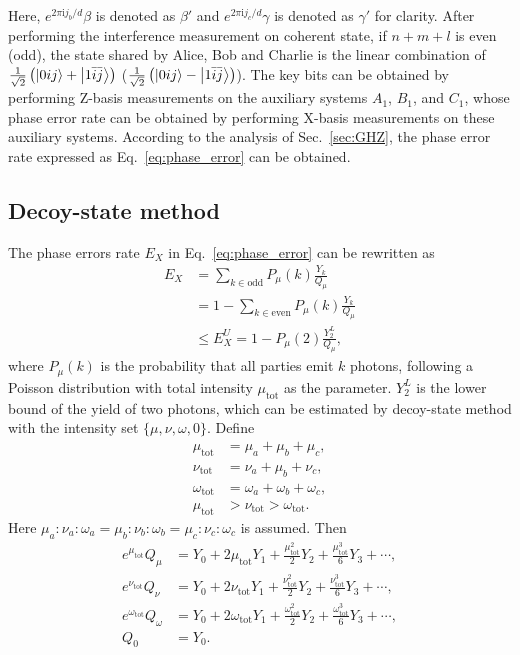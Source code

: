 \documentclass[aps,twocolumn,superscriptaddress,showpacs,nofootinbib]{revtex4-2}
\renewcommand{\i}{\mathrm{i}}
\begin{document}
Here, $e^{2\pi\i j_b/d}\beta$ is denoted as $\beta'$ and $e^{2\pi\i j_c/d}\gamma$ is denoted as $\gamma'$ for clarity. After performing the interference measurement on coherent state, if $n+m+l$ is even (odd), the state shared by Alice, Bob and Charlie is the linear combination of $\frac{1}{\sqrt{2}}\left(\ket{0 i j} + \ket{1 \bar{i} \bar{j}}\right)$ ($\frac{1}{\sqrt{2}}\left(\ket{0 i j} - \ket{1 \bar{i} \bar{j}}\right)$). The key bits can be obtained by performing Z-basis measurements on the auxiliary systems $A_1$, $B_1$, and $C_1$, whose phase error rate can be obtained by performing X-basis measurements on these auxiliary systems. According to the analysis of Sec.~\ref{sec:GHZ}, the phase error rate expressed as Eq.~\eqref{eq:phase_error} can be obtained.


\subsection{Decoy-state method}\label{sec:dsm}
The phase errors rate $E_X$ in Eq.~\eqref{eq:phase_error} can be rewritten as
\begin{equation}
\begin{split}
E_X & = \sum_{k \in \text{odd}} P_\mu(k) \frac{Y_k}{Q_\mu} \\
& = 1- \sum_{k \in \text{even}} P_\mu(k) \frac{Y_k}{Q_\mu} \\
& \leq E_X^U = 1 - P_\mu(2) \frac{Y_2^L}{Q_\mu},
\end{split}
\end{equation}
where $P_\mu(k)$ is the probability that all parties emit $k$ photons, following a Poisson distribution with total intensity $\mu_\text{tot}$ as the parameter. $Y_2^L$ is the lower bound of the yield of two photons, which can be estimated by decoy-state method with the intensity set $\{ \mu , \nu , \omega , 0 \}$. Define
\begin{equation}
\begin{split}
\mu_\text{tot} &= \mu_a + \mu_b + \mu_c, \\
\nu_\text{tot} &= \nu_a + \mu_b + \nu_c, \\
\omega_\text{tot} &= \omega_a + \omega_b + \omega_c, \\
\mu_\text{tot} &> \nu_\text{tot} > \omega_\text{tot}.
\end{split}
\end{equation}
Here $\mu_a : \nu_a : \omega_a = \mu_b : \nu_b : \omega_b = \mu_c : \nu_c : \omega_c$ is assumed. Then
\begin{equation}
\begin{split}
e^{\mu_\text{tot}} Q_\mu &= Y_0 + 2\mu_\text{tot} Y_1 + \frac{\mu_\text{tot}^2}{2}Y_2 + \frac{\mu_\text{tot}^3}{6}Y_3 + \cdots, \\
e^{\nu_\text{tot}} Q_\nu &= Y_0 + 2\nu_\text{tot} Y_1 + \frac{\nu_\text{tot}^2}{2}Y_2 + \frac{\nu_\text{tot}^3}{6}Y_3 + \cdots, \\
e^{\omega_\text{tot}} Q_\omega &= Y_0 + 2\omega_\text{tot} Y_1 + \frac{\omega_\text{tot}^2}{2}Y_2 + \frac{\omega_\text{tot}^3}{6}Y_3 + \cdots, \\
Q_0 &= Y_0.
\end{split}
\end{equation}
\end{document}
